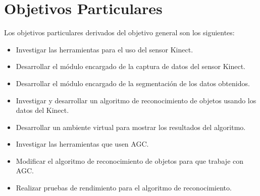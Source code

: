 \section{Objetivos Particulares}

   Los objetivos particulares derivados del objetivo general son los siguientes:
    \begin{itemize}
        \item Investigar las herramientas para el uso del sensor Kinect.
        \item Desarrollar el módulo encargado de la captura de datos del sensor Kinect.
        \item Desarrollar el módulo encargado de la segmentación de los datos obtenidos.
        \item Investigar y desarrollar un algoritmo de reconocimiento de objetos usando los datos del Kinect. 
        \item Desarrollar un ambiente virtual para mostrar los resultados del algoritmo.
        \item Investigar las herramientas que usen AGC.
        \item Modificar el algoritmo de reconocimiento de objetos para que trabaje con AGC.
        \item Realizar pruebas de rendimiento para el algoritmo de reconocimiento.
    \end{itemize}
